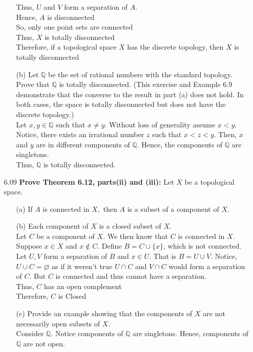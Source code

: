 \documentclass[12pt]{article}
\newcommand{\Q}{\mathbb{Q}}
\begin{document}
\begin{enumerate}
\begin{enumerate}
			Thus, $ U $ and $ V $ form a separation of $ A $.\\
			Hence, $ A $ is disconnected\\
			So, only one point sets are connected\\
			Thus, $ X $ is totally disconnected\\
			Therefore, if a topological space $X$ has the discrete topology, then $X$ is totally disconnected
			\item[(b)] Let $\mathbb { Q }$ be the set of rational numbers with the standard topology. Prove	that $\mathbb { Q }$ is totally disconnected. (This exercise and Example 6.9 demonstrate that the converse to the result in part (a) does not hold. In both cases, the space is totally disconnected but does not have the discrete topology.)\\
			Let $ x,y \in \mathbb{ Q } $ such that $ x\not=y $. Without loss of generality assume $ x<y $. Notice, there exists an irrational number $ z $ such that $ x<z<y $. Then, $ x $ and $ y $ are in different components of $ \mathbb{ Q } $. Hence, the components of $ \mathbb{ Q } $ are singletons.\\
			Thus, $ \mathbb{ Q } $ is totally disconnected.
		\end{enumerate}
		
		\item[6.09] \textbf{Prove Theorem 6.12, parts(ii) and (iii):} Let $ X $ be a topological space.
		\begin{enumerate}
			\item[(a)]If $A$ is connected in $X ,$ then $A$ is a subset of a component of $X .$
			\item[(b)]Each component of $X$ is a closed subset of $X .$\\
				Let $ C $ be a component of $ X $. We then know that $ C $ is connected in $ X $. Suppose $ x \in X $ and $ x\notin C $. Define $ B = C\cup \{x\} $, which is not connected. Let $ U,V $ form a separation of $ B $ and $ x\in U $. That is $ B=U\cup V $. Notice, $ U\cup C = \varnothing $ as if it weren't true $ U\cap C $ and $ V\cap C $ would form a separation of $ C $. But $ C $ is connected and thus cannot have a separation. \\
				Thus, $ C $  has an open complement\\
				Therefore, $ C $ is Closed 
			\item[(c)] Provide an example showing that the components of $X$ are not necessarily
			open subsets of $X .$\\
			Consider $ \mathbb{ Q } $. Notice components of $ \mathbb{ Q } $ are singletons. Hence, components of $ \Q $ are not open.
		\end{enumerate}
		

\end{enumerate}
\end{document}
